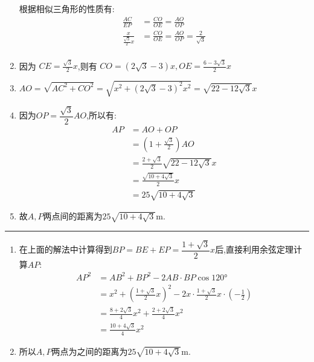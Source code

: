 \begin{questions}
\begin{solution}
\begin{enumerate}[label=\protect\circled{\arabic*}, noitemsep]
			      根据相似三角形的性质有:
			      \begin{align*}
				      \frac{AC}{EP}                 & = \frac{CO}{OE} = \frac{AO}{OP}                     \\
				      \frac{x}{\frac{\sqrt{3}}{2}x} & = \frac{CO}{OE} = \frac{AO}{OP}= \frac{2}{\sqrt{3}} \\
			      \end{align*}
			\item 因为 \( CE=\frac{\sqrt{3}}{2}x \),则有 \( CO = (2\sqrt{3} - 3)x, OE = \frac{6 - 3\sqrt{3}}{2}x \)
			\item \( AO = \sqrt{AC^2 + CO^2} = \sqrt{x^2 + (2\sqrt{3} - 3)^2x^2} = \sqrt{22 - 12\sqrt{3}}x \)
			\item 因为$OP=\dfrac{\sqrt{3}}{2}AO$,所以有:
			      \begin{align*}
				      AP & = AO + OP                                     \\
				         & = (1+\frac{\sqrt{3}}{2})AO                    \\
				         & = \frac{2+\sqrt{3}}{2}\sqrt{22 - 12\sqrt{3}}x \\
				         & = \frac{\sqrt{10 + 4\sqrt{3}}}{2}x            \\
				         & = 25\sqrt{10 + 4\sqrt{3}}
			      \end{align*}
			\item 故$A,P$两点间的距离为$25\sqrt{10+4\sqrt{3}}\unit{\meter}$.
		\end{enumerate}
		\pagebreak
		\hrule
		\begin{enumerate}[label=\protect\circled{\arabic*}]
			\color{green!50!blue}
			\item 在上面的解法中计算得到$BP=BE+EP=\dfrac{1+\sqrt{3}}{2}x$后,直接利用余弦定理计算$AP$:
			      \begin{align*}
				      AP^2 & = AB^2 + BP^2 - 2AB\cdot BP\cos\ang{120}                                                     \\
				           & = x^2 + \left( \frac{1+\sqrt{3}}{2}x \right)^2 - 2x\cdot\frac{1+\sqrt{3}}{2}x\cdot(-\frac12) \\
				           & = \frac{8+2\sqrt{3}}{4}x^2 + \frac{2+2\sqrt{3}}{4}x^2                                        \\
				           & = \frac{10+4\sqrt{3}}{4}x^2
			      \end{align*}
			\item 所以$A,P$两点为之间的距离为$25\sqrt{10+4\sqrt{3}}\unit{\meter}$.
		\end{enumerate}
	\end{solution}


\end{questions}
